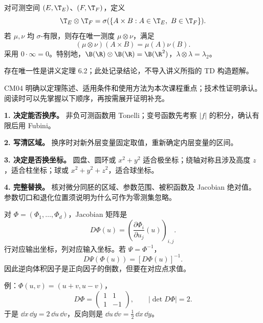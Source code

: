 对可测空间 $(E,\T_E)$、$(F,\T_F)$，定义
\[
\T_E\otimes\T_F
=\sigma(\{A\times B:A\in\T_E,\ B\in\T_F\}).
\]
若 $\mu,\nu$ 均 $\sigma$-有限，则存在唯一测度 $\mu\otimes\nu$，满足
\[
(\mu\otimes\nu)(A\times B)=\mu(A)\nu(B).
\]
采用 $0\cdot\infty=0$。特别地，$\B(\R)\otimes\B(\R)=\B(\R^2)$，$\lambda\otimes\lambda=\lambda_2$。

存在唯一性是讲义定理 6.2；此处记录结论，不导入讲义所指的 TD 构造题解。

CM04 明确以定理陈述、适用条件和使用方法为本次课程重点；技术性证明承认。阅读时可以先掌握以下顺序，再按需展开证明补充。

\textbf{1. 决定能否换序。} 非负可测函数用 Tonelli；变号函数先考察 $|f|$ 的积分，确认有限后用 Fubini。

\textbf{2. 写清区域。} 换序时对新外层变量固定取值，重新确定内层变量的区间。

\textbf{3. 决定是否换坐标。} 圆盘、圆环或 $x^2+y^2$ 适合极坐标；绕轴对称且涉及高度 $z$，适合柱坐标；球或 $x^2+y^2+z^2$，适合球坐标。

\textbf{4. 完整替换。} 核对微分同胚的区域、参数范围、被积函数及 Jacobian 绝对值。参数切口和退化位置须说明为什么可作为零测集忽略。

对 $\Phi=(\Phi_1,\ldots,\Phi_d)$，Jacobian 矩阵是
\[
D\Phi(u)=\left(\frac{\partial\Phi_i}{\partial u_j}(u)\right)_{i,j}.
\]
行对应输出坐标，列对应输入坐标。若 $\Psi=\Phi^{-1}$，
\[
D\Psi(\Phi(u))=[D\Phi(u)]^{-1}.
\]
因此逆向体积因子是正向因子的倒数，但要在对应点求值。

例：$\Phi(u,v)=(u+v,u-v)$，
\[
D\Phi=\begin{pmatrix}1&1\\1&-1\end{pmatrix},
\qquad |\det D\Phi|=2.
\]
于是 $\dd x\,\dd y=2\,\dd u\,\dd v$，反向则是 $\dd u\,\dd v=\tfrac12\,\dd x\,\dd y$。

